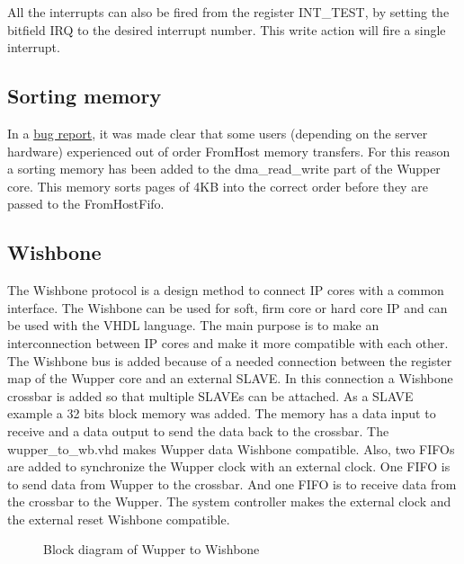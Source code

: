 All the interrupts can also be fired from the register INT\_TEST, by setting the bitfield IRQ to the desired interrupt number. This write action will fire a single interrupt. 
\subsection{Sorting memory}
In a \href{https://opencores.org/projects/virtex7_pcie_dma/issues/7}{bug report}, it was made clear that some users (depending on the server hardware) experienced out of order FromHost memory transfers. For this reason a sorting memory has been added to the dma\_read\_write part of the Wupper core. This memory sorts pages of 4KB into the correct order before they are passed to the FromHostFifo.

\newpage
\subsection{Wishbone}
\begin{flushleft}
	The Wishbone protocol is a design method to connect IP cores with a common interface.
	The Wishbone can be used for soft, firm core or hard core IP and can be used with the VHDL language. The main purpose is to make an interconnection between IP cores and make it more compatible with each other. \newline
	The Wishbone bus is added because of a needed connection between the register map of the Wupper core and an external SLAVE. In this connection a Wishbone crossbar is added so that multiple SLAVEs can be attached. As a SLAVE example a 32 bits block memory was added. The memory has a data input to receive and a data output to send the data back to the crossbar. \newline
	The wupper\_to\_wb.vhd makes Wupper data Wishbone compatible. Also, two FIFOs are added to synchronize the Wupper clock  with an external clock. One FIFO is to send data from Wupper to the crossbar. And one FIFO is to receive  data from the crossbar to the Wupper. \newline
	The system controller makes the external clock and the external reset Wishbone compatible.
	\begin{figure}[H]
		\centering
		
		\caption{Block diagram of Wupper to Wishbone}
		\label{fig:wupper_to_wishbone}
	\end{figure}
\end{flushleft}

\newpage